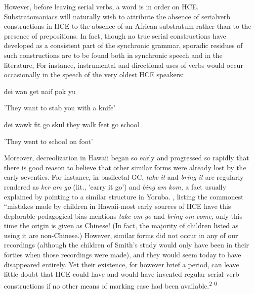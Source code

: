 However, before leaving serial verbs, a word is in order on HCE. Substratomaniacs will naturally wish to attribute the absence of serial\-verb constructions in HCE to the absence of an African substratum rather than to the presence of prepositions. In fact, though no true serial constructions have developed as a consistent part of the syn\-chronic grammar, sporadic residues of such constructions are to be found both in synchronic speech and in the literature, For instance, instrumental and directional uses of verbs would occur occasionally in the speech of the very oldest HCE speakers:

\ea\label{ex:263}
 dei wan get naif pok yu
\glt
\z

'They want to stab you with a knife'

\ea\label{ex:264}
 dei wawk fit go skul they walk feet go school
\glt
\z

'They went to school on foot'

Moreover, decreolization in Hawaii began so early and progressed so rapidly that there is good reason to believe that other similar forms were already lost by the early seventies. For instance, in basilectal GC, \textit{take} \textit{it} and \textit{bring} \textit{it} are regularly rendered as \textit{ker} \textit{am} \textit{go }(lit., 'carry it go') and \textit{bi}\textit{n}\textit{g} \textit{am} \textit{k}\textit{om,} a fact usually explained by pointing to a similar structure in Yoruba. \citet{Smith1939}, listing the commonest ``mistakes{\textquotedbl}
made by children in Hawaii-most early sources of HCE have this deplorable pedagogical bias-mentions \textit{take} \textit{om} \textit{go} and \textit{bring} \textit{om} \textit{come,} only this time the origin is given as Chinese! (In fact, the majority of children listed as using it are non-Chinese.) However, similar forms did not occur in any of our recordings (although the children of Smith's study would only have been in their forties when those recordings were made), and they would seem today to have disappeared entirely. Yet their existence, for however brief a period, can leave little doubt that HCE could have and would have invented regular serial-verb constructions if no other means of marking case had been available.\textsuperscript{2} \textsuperscript{0}

